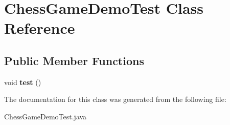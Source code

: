 \hypertarget{class_chess_game_demo_test}{\section{Chess\-Game\-Demo\-Test Class Reference}
\label{class_chess_game_demo_test}
}
\subsection*{Public Member Functions}
\begin{DoxyCompactItemize}
\item 
\hypertarget{class_chess_game_demo_test_ac92ec040d29bab38c5fd83ebaf19d9f9}{void {\bfseries test} ()}\label{class_chess_game_demo_test_ac92ec040d29bab38c5fd83ebaf19d9f9}

\end{DoxyCompactItemize}


The documentation for this class was generated from the following file\-:\begin{DoxyCompactItemize}
\item 
Chess\-Game\-Demo\-Test.\-java\end{DoxyCompactItemize}
